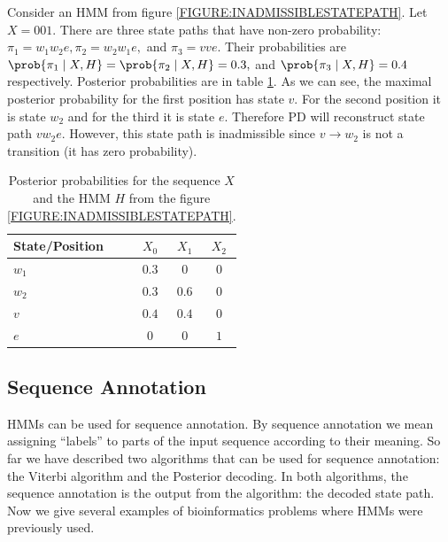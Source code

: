 \begin{example}
Consider an HMM from figure \ref{FIGURE:INADMISSIBLESTATEPATH}. Let $X=001$. There
are three state paths that have non-zero probability:
$\pi_1=w_1w_2e,\pi_2=w_2w_1e,$ and $\pi_3=vve$. Their probabilities are
$\prob{\pi_1\mid X,H}=\prob{\pi_2\mid X,H}=0.3,$ and $\prob{\pi_3\mid X,H}=0.4$
respectively.
Posterior probabilities are in table \ref{TABLE:INADMISSIBLESTATEPATH}.
As we can see, the maximal posterior probability for the first position has state
$v$. For the second position it is state $w_2$ and for the third it is state
$e$. Therefore PD will reconstruct state path $vw_2e$. However, this state path 
is inadmissible since  $v\to w_2$ is not a transition (it has zero probability).

\begin{table}
\begin{center}
\begin{tabular}{|l|c|c|c|}
\hline
State/Position & $X_0$ & $X_1$ & $X_2$ \\\hline
$w_1$ & $0.3$ & $0$ & $0$ \\\hline
$w_2$ & $0.3$ & $0.6$ & $0$ \\\hline
$v$   & $0.4$ & $0.4$ & $0$\\\hline
$e$  & $0$ & $0$ & $1$ \\\hline
\end{tabular}
\end{center}
\caption[Example of posterior probabilities.]{Posterior probabilities for
the sequence $X$ and the HMM $H$ from the figure \ref{FIGURE:INADMISSIBLESTATEPATH}.
}\label{TABLE:INADMISSIBLESTATEPATH}
\end{table}

\end{example}

\subsection{Sequence Annotation}


HMMs can be used for sequence annotation. By sequence annotation we mean
assigning ``labels'' to parts of the input sequence according to their meaning.
So far we have described two algorithms that can be used for sequence
annotation: the Viterbi algorithm and the Posterior decoding. In both
algorithms, the sequence annotation is the output from the algorithm: the
decoded state path. Now we give several examples of bioinformatics problems
where HMMs were previously used. 

